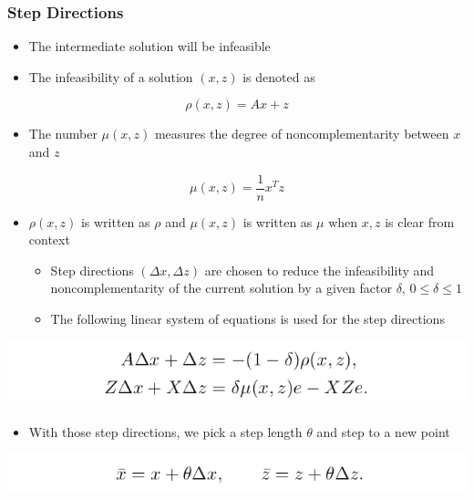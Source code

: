 \documentclass[11pt]{article}
\begin{document}
\subsubsection{Step Directions}
\label{sec:orgbd374f6}
\begin{itemize}
\item The intermediate solution will be infeasible
\item The infeasibility of a solution \((x,z)\) is denoted as
\end{itemize}
\begin{equation}
  \rho(x,z) = Ax + z
\end{equation}
\begin{itemize}
\item The number \(\mu(x,z)\) measures the degree of noncomplementarity between \(x\) and \(z\)
\end{itemize}
\begin{equation}
	\mu(x,z) = \frac1n x^Tz
\end{equation}
\begin{itemize}
\item \(\rho(x,z)\) is written as \(\rho\) and  \(\mu(x,z)\) is written as \(\mu\) when \(x,z\) is clear from context
\begin{itemize}
\item Step directions \((\Delta x, \Delta z)\) are chosen to reduce the infeasibility and noncomplementarity of the current solution by a given factor \(\delta\), \(0 \leq \delta \leq 1\)
\item The following linear system of equations is used for the step directions
\end{itemize}
\end{itemize}
\begin{center}
\includegraphics[width=.9\linewidth]{The Homogeneous Self-Dual Method/screenshot_2019-03-11_18-07-50.png}
\end{center}
\begin{itemize}
\item With those step directions, we pick a step length \(\theta\) and step to a new point
\end{itemize}
\begin{center}
\includegraphics[width=.9\linewidth]{The Homogeneous Self-Dual Method/screenshot_2019-03-11_18-08-47.png}
\end{center}
\end{document}
